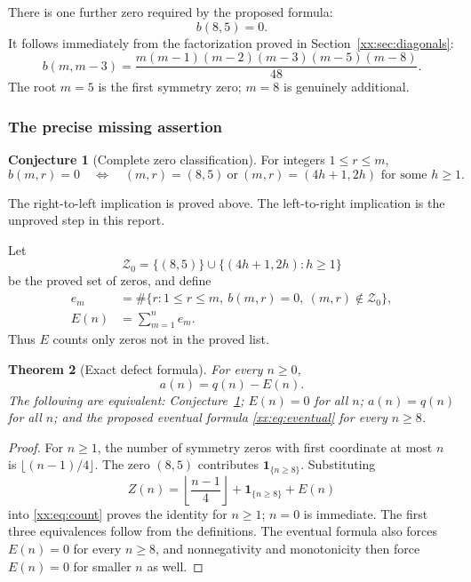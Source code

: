 \documentclass[11pt,a4paper]{article}
\numberwithin{equation}{section}
\newtheorem{theorem}{Theorem}[section]
\theoremstyle{definition}
\newtheorem{conjecture}[theorem]{Conjecture}
\theoremstyle{remark}
\theoremstyle{plain}
\newcommand{\ZZ}{\mathcal Z}
\newcommand{\ind}[1]{\mathbf{1}_{\{#1\}}}
\begin{document}
There is one further zero required by the proposed formula:
\begin{equation}\label{xx:eq:exception}
 b(8,5)=0.
\end{equation}
It follows immediately from the factorization proved in
Section~\ref{xx:sec:diagonals}:
\[
 b(m,m-3)=\frac{m(m-1)(m-2)(m-3)(m-5)(m-8)}{48}.
\]
The root $m=5$ is the first symmetry zero; $m=8$ is genuinely additional.

\subsubsection{The precise missing assertion}
\begin{conjecture}[Complete zero classification]\label{xx:conj:zeros}
For integers $1\le r\le m$,
\begin{equation}\label{xx:eq:zeroconj}
 b(m,r)=0\quad\Longleftrightarrow\quad
 (m,r)=(8,5)\ \text{or}\ (m,r)=(4h+1,2h)\text{ for some }h\ge1.
\end{equation}
\end{conjecture}

The right-to-left implication is proved above. The left-to-right implication
is the unproved step in this report.

Let
\[
 \ZZ_0=\{(8,5)\}\cup\{(4h+1,2h):h\ge1\}
\]
be the proved set of zeros, and define
\begin{align*}
 e_m&=\#\{r:1\le r\le m,\ b(m,r)=0,\ (m,r)\notin\ZZ_0\},\\
 E(n)&=\sum_{m=1}^n e_m.
\end{align*}
Thus $E$ counts only zeros not in the proved list.

\begin{theorem}[Exact defect formula]\label{xx:thm:defect}
For every $n\ge0$,
\[
 a(n)=q(n)-E(n).
\]
The following are equivalent: Conjecture~\ref{xx:conj:zeros}; $E(n)=0$ for all
$n$; $a(n)=q(n)$ for all $n$; and the proposed eventual formula
\eqref{xx:eq:eventual} for every $n\ge8$.
\end{theorem}
\begin{proof}
For $n\ge1$, the number of symmetry zeros with first coordinate at most $n$
is $\lfloor(n-1)/4\rfloor$. The zero $(8,5)$ contributes
$\ind{n\ge8}$. Substituting
\[
 Z(n)=\left\lfloor\frac{n-1}{4}\right\rfloor+\ind{n\ge8}+E(n)
\]
into \eqref{xx:eq:count} proves the identity for $n\ge1$; $n=0$ is immediate.
The first three equivalences follow from the definitions. The eventual
formula also forces $E(n)=0$ for every $n\ge8$, and nonnegativity and
monotonicity then force $E(n)=0$ for smaller $n$ as well.
\end{proof}
\end{document}
